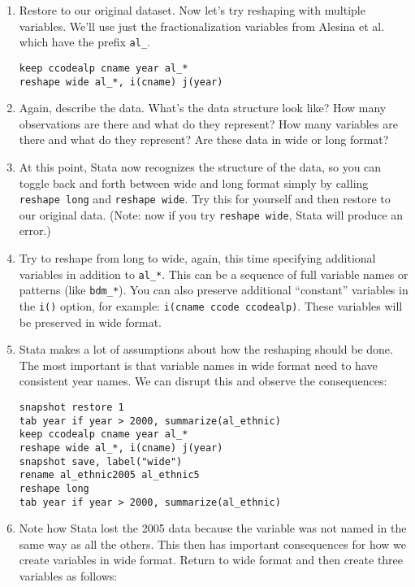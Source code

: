 \documentclass[a4paper,12pt]{article}
\begin{document}
\begin{enumerate}
\item Restore to our original dataset. Now let's try reshaping with multiple variables. We'll use just the fractionalization variables from Alesina et al. which have the prefix \texttt{al\_}.


\begin{verbatim}
keep ccodealp cname year al_*
reshape wide al_*, i(cname) j(year)
\end{verbatim}

\item Again, describe the data. What's the data structure look like? How many observations are there and what do they represent? How many variables are there and what do they represent? Are these data in wide or long format?

\item At this point, Stata now recognizes the structure of the data, so you can toggle back and forth between wide and long format simply by calling \texttt{reshape long} and \texttt{reshape wide}. Try this for yourself and then restore to our original data. (Note: now if you try \texttt{reshape wide}, Stata will produce an error.)

\item Try to reshape from long to wide, again, this time specifying additional variables in addition to \texttt{al\_*}. This can be a sequence of full variable names or patterns (like \texttt{bdm\_*}). You can also preserve additional ``constant'' variables in the \texttt{i()} option, for example: \texttt{i(cname ccode ccodealp)}. These variables will be preserved in wide format.

\item Stata makes a lot of assumptions about how the reshaping should be done. The most important is that variable names in wide format need to have consistent year names. We can disrupt this and observe the consequences:

\begin{verbatim}
snapshot restore 1
tab year if year > 2000, summarize(al_ethnic)
keep ccodealp cname year al_*
reshape wide al_*, i(cname) j(year)
snapshot save, label("wide")
rename al_ethnic2005 al_ethnic5
reshape long
tab year if year > 2000, summarize(al_ethnic)
\end{verbatim}

\item Note how Stata lost the 2005 data because the variable was not named in the same way as all the others. This then has important consequences for how we create variables in wide format. Return to wide format and then create three variables as follows:


\end{enumerate}
\end{document}
